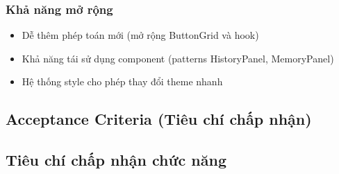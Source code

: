 \subsubsection{Khả năng mở rộng}
\begin{itemize}
    \item Dễ thêm phép toán mới (mở rộng ButtonGrid và hook)
    \item Khả năng tái sử dụng component (patterns HistoryPanel, MemoryPanel)
    \item Hệ thống style cho phép thay đổi theme nhanh
\end{itemize}

\subsection{Acceptance Criteria (Tiêu chí chấp nhận)}

\subsection{Tiêu chí chấp nhận chức năng}


